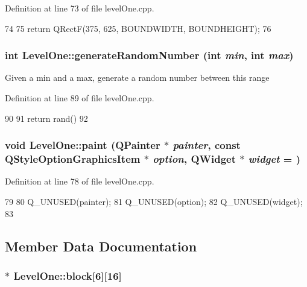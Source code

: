 Definition at line 73 of file levelOne.cpp.


\begin{DoxyCode}
74 {
75     return QRectF(375, 625, BOUNDWIDTH, BOUNDHEIGHT);
76 }
\end{DoxyCode}
\hypertarget{class_level_one_ad130fe4bb9582fdaaef1e14a3e00d381}{
\subsubsection[{generateRandomNumber}]{\setlength{\rightskip}{0pt plus 5cm}int LevelOne::generateRandomNumber (int {\em min}, \/  int {\em max})}}
\label{class_level_one_ad130fe4bb9582fdaaef1e14a3e00d381}
Given a min and a max, generate a random number between this range 

Definition at line 89 of file levelOne.cpp.


\begin{DoxyCode}
90 {
91     return rand() %
92 }
\end{DoxyCode}
\hypertarget{class_level_one_a20ac2bcc6833dde6e650f953434a84e2}{
\subsubsection[{paint}]{\setlength{\rightskip}{0pt plus 5cm}void LevelOne::paint (QPainter $\ast$ {\em painter}, \/  const QStyleOptionGraphicsItem $\ast$ {\em option}, \/  QWidget $\ast$ {\em widget} = {})}}
\label{class_level_one_a20ac2bcc6833dde6e650f953434a84e2}


Definition at line 78 of file levelOne.cpp.


\begin{DoxyCode}
79 {
80     Q_UNUSED(painter);
81     Q_UNUSED(option);
82     Q_UNUSED(widget);
83 }
\end{DoxyCode}


\subsection{Member Data Documentation}
\hypertarget{class_level_one_aaca223888bdff2ad013abbd0bc4f672e}{
\subsubsection[{block}]{$\ast$ {\bf LevelOne::block}\mbox{[}6\mbox{]}\mbox{[}16\mbox{]}}}
\label{class_level_one_aaca223888bdff2ad013abbd0bc4f672e}


